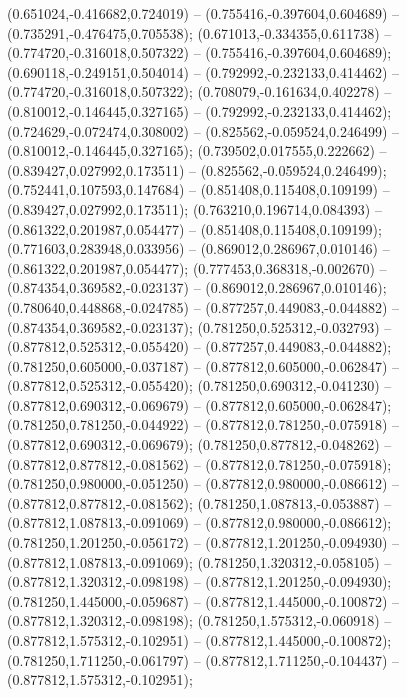  (0.651024,-0.416682,0.724019) -- (0.755416,-0.397604,0.604689) -- (0.735291,-0.476475,0.705538);
 (0.671013,-0.334355,0.611738) -- (0.774720,-0.316018,0.507322) -- (0.755416,-0.397604,0.604689);
 (0.690118,-0.249151,0.504014) -- (0.792992,-0.232133,0.414462) -- (0.774720,-0.316018,0.507322);
 (0.708079,-0.161634,0.402278) -- (0.810012,-0.146445,0.327165) -- (0.792992,-0.232133,0.414462);
 (0.724629,-0.072474,0.308002) -- (0.825562,-0.059524,0.246499) -- (0.810012,-0.146445,0.327165);
 (0.739502,0.017555,0.222662) -- (0.839427,0.027992,0.173511) -- (0.825562,-0.059524,0.246499);
 (0.752441,0.107593,0.147684) -- (0.851408,0.115408,0.109199) -- (0.839427,0.027992,0.173511);
 (0.763210,0.196714,0.084393) -- (0.861322,0.201987,0.054477) -- (0.851408,0.115408,0.109199);
 (0.771603,0.283948,0.033956) -- (0.869012,0.286967,0.010146) -- (0.861322,0.201987,0.054477);
 (0.777453,0.368318,-0.002670) -- (0.874354,0.369582,-0.023137) -- (0.869012,0.286967,0.010146);
 (0.780640,0.448868,-0.024785) -- (0.877257,0.449083,-0.044882) -- (0.874354,0.369582,-0.023137);
 (0.781250,0.525312,-0.032793) -- (0.877812,0.525312,-0.055420) -- (0.877257,0.449083,-0.044882);
 (0.781250,0.605000,-0.037187) -- (0.877812,0.605000,-0.062847) -- (0.877812,0.525312,-0.055420);
 (0.781250,0.690312,-0.041230) -- (0.877812,0.690312,-0.069679) -- (0.877812,0.605000,-0.062847);
 (0.781250,0.781250,-0.044922) -- (0.877812,0.781250,-0.075918) -- (0.877812,0.690312,-0.069679);
 (0.781250,0.877812,-0.048262) -- (0.877812,0.877812,-0.081562) -- (0.877812,0.781250,-0.075918);
 (0.781250,0.980000,-0.051250) -- (0.877812,0.980000,-0.086612) -- (0.877812,0.877812,-0.081562);
 (0.781250,1.087813,-0.053887) -- (0.877812,1.087813,-0.091069) -- (0.877812,0.980000,-0.086612);
 (0.781250,1.201250,-0.056172) -- (0.877812,1.201250,-0.094930) -- (0.877812,1.087813,-0.091069);
 (0.781250,1.320312,-0.058105) -- (0.877812,1.320312,-0.098198) -- (0.877812,1.201250,-0.094930);
 (0.781250,1.445000,-0.059687) -- (0.877812,1.445000,-0.100872) -- (0.877812,1.320312,-0.098198);
 (0.781250,1.575312,-0.060918) -- (0.877812,1.575312,-0.102951) -- (0.877812,1.445000,-0.100872);
 (0.781250,1.711250,-0.061797) -- (0.877812,1.711250,-0.104437) -- (0.877812,1.575312,-0.102951);

